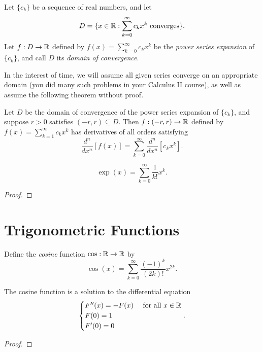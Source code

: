 \documentclass[letterpaper, twoside, 12pt]{book}
\begin{document}
\begin{definition}
  Let \(\{c_k\}\) be a sequence of real numbers, and let
  \[
    D
      =
    \{
      x\in\mathbb R
    :
      \sum_{k=0}^\infty c_kx^k
      \text{ converges}
    \}
  .\]
  Let \(f:D\to\mathbb R\) defined by \(f(x)=\sum_{k=0}^\infty c_kx^k\) be
  the \textit{power series expansion} of \(\{c_k\}\), and call
  \(D\) its \textit{domain of convergence}.
\end{definition}

In the interest of time, we will assume all given series converge on
an appropriate domain (you did many such problems in your
Calculus II course), as well as assume the following theorem without proof.

\begin{theorem}[9.41]
  Let \(D\) be the domain of convergence of the power series expansion
  of \(\{c_k\}\), and suppose \(r>0\) satisfies \((-r,r)\subseteq D\).
  Then \(f:(-r,r)\to\mathbb R\) defined by
  \(f(x)=\sum_{k=1}^\infty c_kx^k\) has derivatives of all orders
  satisfying
  \[
    \frac{d^n}{dx^n}[f(x)]
      =
    \sum_{k=0}^\infty \frac{d^n}{dx^n}[c_kx^k]
  .\]
\end{theorem}

\begin{theorem}
  \[
   \exp(x)
      =
    \sum_{k=0}^\infty \frac{1}{k!}x^k
  .\]
\end{theorem}
\begin{proof}

\end{proof}

\section{Trigonometric Functions}

\begin{definition}
  Define the \textit{cosine} function \(\cos:\mathbb R\to\mathbb R\) by
  \[
    \cos(x)
      =
    \sum_{k=0}^\infty
    \frac{(-1)^k}{(2k)!}x^{2k}
  .\]
\end{definition}

\begin{theorem}[9.42]
  The cosine function is a solution to the differential equation
  \[
    \begin{cases}
      F''(x)=-F(x) & \text{ for all } x\in \mathbb R \\
      F(0)=1 \\
      F'(0)=0
    \end{cases}
  .\]
\end{theorem}
\begin{proof}

\end{proof}
\end{document}
